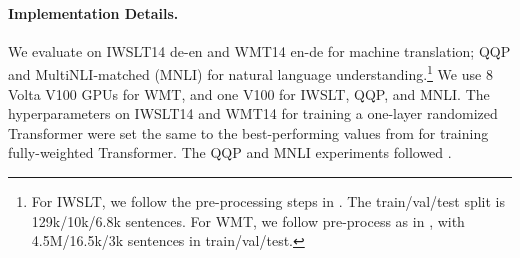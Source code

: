 \paragraph{Implementation Details.} We evaluate on IWSLT14 de-en \citep{Cettolo:2015ReportOT} and WMT14 en-de \citep{bojar:2014-findings} for machine translation; QQP \citep{iyer2017qqp} and MultiNLI-matched (MNLI) \citep{Williams2017mnli} for natural language understanding.\footnote{For IWSLT, we follow the pre-processing steps in \citet{edunov:2018classical}. The train/val/test split is 129k/10k/6.8k sentences. 
For WMT, we follow pre-process as in \citet{Ott:2018scaling}, with 4.5M/16.5k/3k sentences in train/val/test.} 
We use 8 Volta V100 GPUs for WMT, and one V100 for IWSLT, QQP, and MNLI. The hyperparameters on IWSLT14 and WMT14 for training a one-layer randomized Transformer were set the same to the best-performing values from \citet{Ott:2018scaling} for training fully-weighted Transformer. The QQP and MNLI experiments followed \citet{Liu:2019roberta}. 








\newcommand{\ari}[1]{\comments{\textcolor{blue}{[\textbf{Ari:} #1]}}}
\newcommand{\ma}[1]{\textcolor{orange}{#1}}



\usepackage{amsmath,amsfonts,bm}

\newcommand{\figleft}{{\em (Left)}}
\newcommand{\figcenter}{{\em (Center)}}
\newcommand{\figright}{{\em (Right)}}
\newcommand{\figtop}{{\em (Top)}}
\newcommand{\figbottom}{{\em (Bottom)}}
\newcommand{\captiona}{{\em (a)}}
\newcommand{\captionb}{{\em (b)}}
\newcommand{\captionc}{{\em (c)}}
\newcommand{\captiond}{{\em (d)}}

\newcommand{\newterm}[1]{{\bf #1}}


